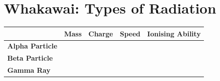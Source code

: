 \documentclass[12pt]{report}
\begin{document}
\section{Whakawai: Types of Radiation}


\begin{table}[ht]
\centering
\begin{tabular}{l|l|l|p{2cm}|l|}
\cline{2-5}
                                              & \textbf{Mass} & \textbf{Charge} & \textbf{Speed} & \textbf{Ionising Ability} \\ \hline
\multicolumn{1}{|l|}{\textbf{Alpha Particle}} &               &                 &                &                           \\ \hline
\multicolumn{1}{|l|}{\textbf{Beta Particle}}  &               &                 &                &                           \\ \hline
\multicolumn{1}{|l|}{\textbf{Gamma Ray}}      &               &                 &                &                           \\ \hline
\end{tabular}
\end{table}
\end{document}
